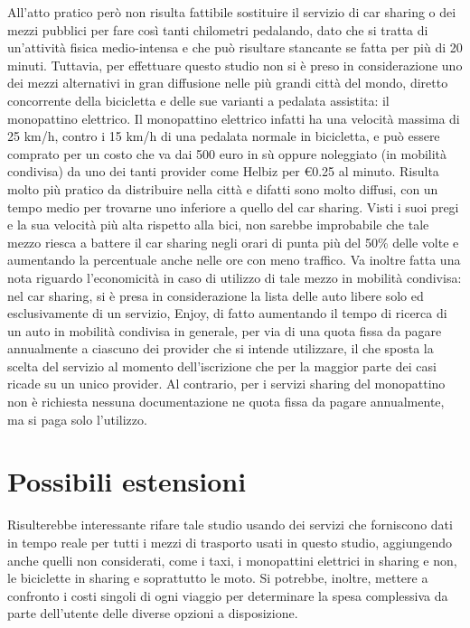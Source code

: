 All'atto pratico però non risulta fattibile sostituire il servizio di car sharing o dei mezzi pubblici per fare così tanti chilometri pedalando, dato che si tratta di un'attività fisica medio-intensa e che può risultare stancante se fatta per più di 20 minuti. Tuttavia, per effettuare questo studio non si è preso in considerazione uno dei mezzi alternativi in gran diffusione nelle più grandi città del mondo, diretto concorrente della bicicletta e delle sue varianti a pedalata assistita: il monopattino elettrico.
Il monopattino elettrico infatti ha una velocità massima di 25 km/h, contro i 15 km/h di una pedalata normale in bicicletta, e può essere comprato per un costo che va dai 500 euro in sù oppure noleggiato (in mobilità condivisa) da uno dei tanti provider come Helbiz per €0.25 al minuto. Risulta molto più pratico da distribuire nella città e difatti sono molto diffusi, con un tempo medio per trovarne uno inferiore a quello del car sharing. Visti i suoi pregi e la sua velocità più alta rispetto alla bici, non sarebbe improbabile che tale mezzo riesca a battere il car sharing negli orari di punta più del 50\% delle volte e aumentando la percentuale anche nelle ore con meno traffico. Va inoltre fatta una nota riguardo l'economicità in caso di utilizzo di tale mezzo in mobilità condivisa: nel car sharing, si è presa in considerazione la lista delle auto libere solo ed esclusivamente di un servizio, Enjoy, di fatto aumentando il tempo di ricerca di un auto in mobilità condivisa in generale, per via di una quota fissa da pagare annualmente a ciascuno dei provider che si intende utilizzare, il che sposta la scelta del servizio al momento dell'iscrizione che per la maggior parte dei casi ricade su un unico provider. Al contrario, per i servizi sharing del monopattino non è richiesta nessuna documentazione ne quota fissa da pagare annualmente, ma si paga solo l'utilizzo.

\section{Possibili estensioni}

Risulterebbe interessante rifare tale studio usando dei servizi che forniscono dati in tempo reale per tutti i mezzi di trasporto usati in questo studio, aggiungendo anche quelli non considerati, come i taxi, i monopattini elettrici in sharing e non, le biciclette in sharing e soprattutto le moto. Si potrebbe, inoltre, mettere a confronto i costi singoli di ogni viaggio per determinare la spesa complessiva da parte dell'utente delle diverse opzioni a disposizione.


